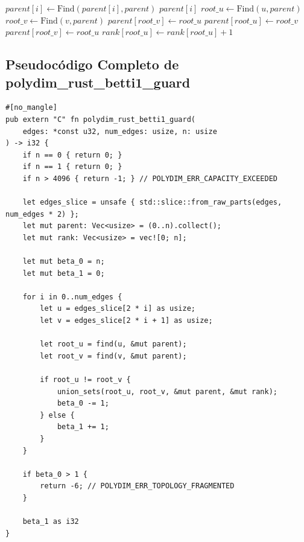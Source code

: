 \begin{algorithm}

\begin{algorithmic}[1]
        \State $parent[i] \gets \text{Find}(parent[i], parent)$ 
    \EndIf
    \State \Return $parent[i]$
\EndProcedure
{}
    \State $root\_u \gets \text{Find}(u, parent)$
    \State $root\_v \gets \text{Find}(v, parent)$
            \State $parent[root\_v] \gets root\_u$
            \State $parent[root\_u] \gets root\_v$
        \Else
            \State $parent[root\_v] \gets root\_u$
            \State $rank[root\_u] \gets rank[root\_u] + 1$
        \EndIf
    \EndIf
\EndProcedure
\end{algorithmic}
\end{algorithm}

\subsection{Pseudocódigo Completo de polydim\_rust\_betti1\_guard}
\begin{verbatim}
#[no_mangle]
pub extern "C" fn polydim_rust_betti1_guard(
    edges: *const u32, num_edges: usize, n: usize
) -> i32 {
    if n == 0 { return 0; }
    if n == 1 { return 0; }
    if n > 4096 { return -1; } // POLYDIM_ERR_CAPACITY_EXCEEDED

    let edges_slice = unsafe { std::slice::from_raw_parts(edges, num_edges * 2) };
    let mut parent: Vec<usize> = (0..n).collect();
    let mut rank: Vec<usize> = vec![0; n];
    
    let mut beta_0 = n;
    let mut beta_1 = 0;
    
    for i in 0..num_edges {
        let u = edges_slice[2 * i] as usize;
        let v = edges_slice[2 * i + 1] as usize;
        
        let root_u = find(u, &mut parent);
        let root_v = find(v, &mut parent);
        
        if root_u != root_v {
            union_sets(root_u, root_v, &mut parent, &mut rank);
            beta_0 -= 1;
        } else {
            beta_1 += 1;
        }
    }
    
    if beta_0 > 1 {
        return -6; // POLYDIM_ERR_TOPOLOGY_FRAGMENTED
    }
    
    beta_1 as i32
}
\end{verbatim}

